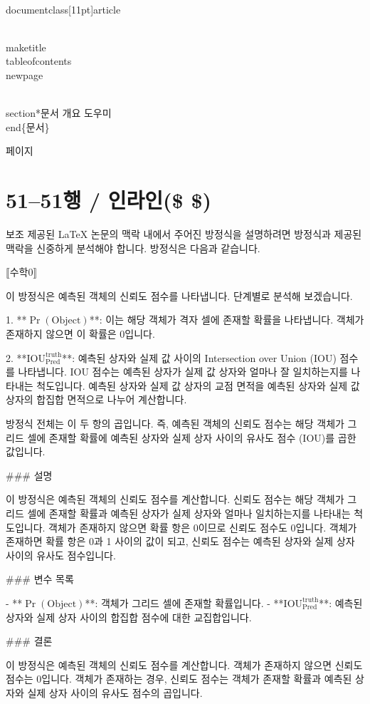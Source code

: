 \\documentclass[11pt]{article}
\begin{document}
\\maketitle
\\tableofcontents
\\newpage

\\section*{문서 개요}
도우미
\\end\{문서\}

\새 페이지

\section*{51–51행 / 인라인(\$ \$) }
보조
제공된 LaTeX 논문의 맥락 내에서 주어진 방정식을 설명하려면 방정식과 제공된 맥락을 신중하게 분석해야 합니다. 방정식은 다음과 같습니다.

⟦수학0⟧

이 방정식은 예측된 객체의 신뢰도 점수를 나타냅니다. 단계별로 분석해 보겠습니다.

1. **\(\Pr(\textrm{Object})\)**: 이는 해당 객체가 격자 셀에 존재할 확률을 나타냅니다. 객체가 존재하지 않으면 이 확률은 0입니다.

2. **\(\textrm{IOU}_{\textrm{Pred}}^{\textrm{truth}}\)**: 예측된 상자와 실제 값 사이의 Intersection over Union (IOU) 점수를 나타냅니다. IOU 점수는 예측된 상자가 실제 값 상자와 얼마나 잘 일치하는지를 나타내는 척도입니다. 예측된 상자와 실제 값 상자의 교점 면적을 예측된 상자와 실제 값 상자의 합집합 면적으로 나누어 계산합니다.

방정식 전체는 이 두 항의 곱입니다. 즉, 예측된 객체의 신뢰도 점수는 해당 객체가 그리드 셀에 존재할 확률에 예측된 상자와 실제 상자 사이의 유사도 점수 (IOU)를 곱한 값입니다.

### 설명

이 방정식은 예측된 객체의 신뢰도 점수를 계산합니다. 신뢰도 점수는 해당 객체가 그리드 셀에 존재할 확률과 예측된 상자가 실제 상자와 얼마나 일치하는지를 나타내는 척도입니다. 객체가 존재하지 않으면 확률 항은 0이므로 신뢰도 점수도 0입니다. 객체가 존재하면 확률 항은 0과 1 사이의 값이 되고, 신뢰도 점수는 예측된 상자와 실제 상자 사이의 유사도 점수입니다.

### 변수 목록

- **\(\Pr(\textrm{Object})\)**: 객체가 그리드 셀에 존재할 확률입니다.
- **\(\textrm{IOU}_{\textrm{Pred}}^{\textrm{truth}}\)**: 예측된 상자와 실제 상자 사이의 합집합 점수에 대한 교집합입니다.

### 결론

이 방정식은 예측된 객체의 신뢰도 점수를 계산합니다. 객체가 존재하지 않으면 신뢰도 점수는 0입니다. 객체가 존재하는 경우, 신뢰도 점수는 객체가 존재할 확률과 예측된 상자와 실제 상자 사이의 유사도 점수의 곱입니다.
\end{document}
